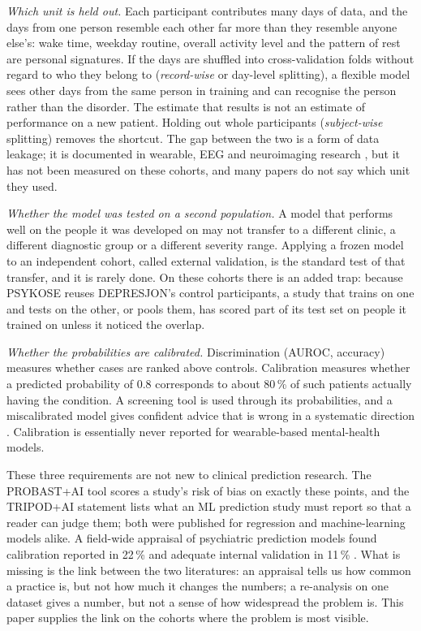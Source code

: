 \documentclass[11pt,a4paper]{article}
\begin{document}
\emph{Which unit is held out.} Each participant contributes many days of data, and the days from
one person resemble each other far more than they resemble anyone else's: wake time, weekday
routine, overall activity level and the pattern of rest are personal signatures. If the days are
shuffled into cross-validation folds without regard to who they belong to (\emph{record-wise} or
day-level splitting), a flexible model sees other days from the same person in training and can
recognise the person rather than the disorder. The estimate that results is not an estimate of
performance on a new patient. Holding out whole participants (\emph{subject-wise} splitting)
removes the shortcut. The gap between the two is a form of data leakage; it is documented in
wearable, EEG and neuroimaging research \cite{saeb2017,jmirai2026}, but it has not been measured on
these cohorts, and many papers do not say which unit they used.

\emph{Whether the model was tested on a second population.} A model that performs well on the
people it was developed on may not transfer to a different clinic, a different diagnostic group or
a different severity range. Applying a frozen model to an independent cohort, called external
validation, is the standard test of that transfer, and it is rarely done. On these cohorts there is
an added trap: because PSYKOSE reuses DEPRESJON's control participants, a study that trains on one
and tests on the other, or pools them, has scored part of its test set on people it trained on
unless it noticed the overlap.

\emph{Whether the probabilities are calibrated.} Discrimination (AUROC, accuracy) measures whether
cases are ranked above controls. Calibration measures whether a predicted probability of 0.8
corresponds to about 80\,\% of such patients actually having the condition. A screening tool is
used through its probabilities, and a miscalibrated model gives confident advice that is wrong in
a systematic direction \cite{vancalster2019}. Calibration is essentially never reported for
wearable-based mental-health models.

These three requirements are not new to clinical prediction research. The PROBAST+AI tool
\cite{moons2025} scores a study's risk of bias on exactly these points, and the TRIPOD+AI statement
\cite{collins2024} lists what an ML prediction study must report so that a reader can judge them;
both were published for regression and machine-learning models alike. A field-wide appraisal of
psychiatric prediction models found calibration reported in 22\,\% and adequate internal validation
in 11\,\% \cite{meehan2022}. What is missing is the link between the two literatures: an appraisal
tells us how common a practice is, but not how much it changes the numbers; a re-analysis on one
dataset gives a number, but not a sense of how widespread the problem is. This paper supplies the
link on the cohorts where the problem is most visible.
\end{document}
